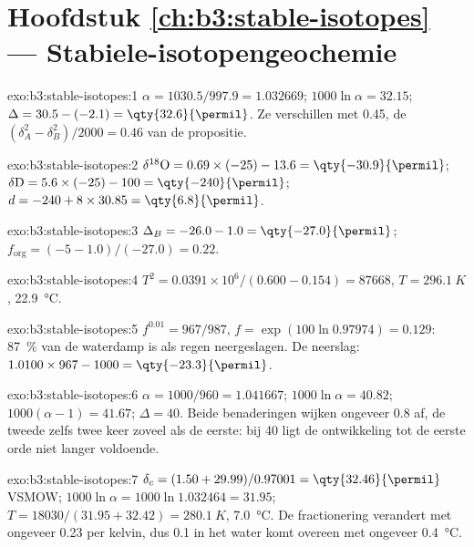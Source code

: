 \section*{Hoofdstuk \ref{ch:b3:stable-isotopes} --- Stabiele-isotopengeochemie}

\begin{solution}{exo:b3:stable-isotopes:1}
$\alpha = 1030.5/997.9 = 1.032669$; $1000\ln\alpha = 32.15$; $\Delta = 30.5 -
(-2.1) = \qty{32.6}{\permil}$. Ze verschillen met \qty{0.45}{\permil}, de
$(\delta_A^2 - \delta_B^2)/2000 = 0.46$ van de propositie.
\end{solution}

\begin{solution}{exo:b3:stable-isotopes:2}
$\delta^{18}\mathrm O = 0.69\times(-25) - 13.6 = \qty{-30.9}{\permil}$;
$\delta\mathrm D = 5.6\times(-25) - 100 = \qty{-240}{\permil}$; $d = -240 +
8\times30.85 = \qty{6.8}{\permil}$.
\end{solution}

\begin{solution}{exo:b3:stable-isotopes:3}
$\Delta_B = -26.0 - 1.0 = \qty{-27.0}{\permil}$; $f_{\mathrm{org}} = (-5 -
1.0)/(-27.0) = 0.22$.
\end{solution}

\begin{solution}{exo:b3:stable-isotopes:4}
$T^2 = 0.0391\times10^6/(0.600 - 0.154) = \num{87668}$, $T = \qty{296.1}{K}$,
\qty{22.9}{\celsius}.
\end{solution}

\begin{solution}{exo:b3:stable-isotopes:5}
$f^{0.01} = 967/987$, $f = \exp(100\ln0.97974) = 0.129$: \qty{87}{\percent} van
de waterdamp is als regen neergeslagen. De neerslag: $1.0100\times967 - 1000 =
\qty{-23.3}{\permil}$.
\end{solution}

\begin{solution}{exo:b3:stable-isotopes:6}
$\alpha = 1000/960 = 1.041667$; $1000\ln\alpha = 40.82$; $1000(\alpha - 1) =
41.67$; $\Delta = 40$. Beide benaderingen wijken ongeveer \qty{0.8}{\permil} af, de
tweede zelfs twee keer zoveel als de eerste: bij \qty{40}{\permil} ligt de ontwikkeling tot
de eerste orde niet langer voldoende.
\end{solution}

\begin{solution}{exo:b3:stable-isotopes:7}
$\delta_c = (1.50 + 29.99)/0.97001 = \qty{32.46}{\permil}$ VSMOW; $1000\ln\alpha
= 1000\ln1.032464 = 31.95$; $T = 18030/(31.95 + 32.42) = \qty{280.1}{K}$,
\qty{7.0}{\celsius}. De fractionering verandert met ongeveer \qty{0.23}{\permil} per
kelvin, dus \qty{0.1}{\permil} in het water komt overeen met ongeveer \qty{0.4}{\celsius}.
\end{solution}

